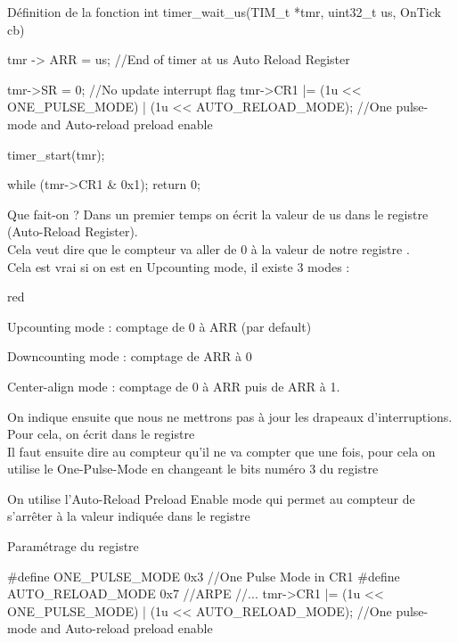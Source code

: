 \begin{Cpp}{Définition de la fonction} 
int timer_wait_us(TIM_t *tmr, uint32_t us, OnTick cb) 
{

tmr -> ARR = us;			//End of timer at us   Auto Reload Register
		
tmr->SR = 0; 														//No update interrupt flag
tmr->CR1 |=  (1u << ONE_PULSE_MODE) | (1u << AUTO_RELOAD_MODE);		//One pulse-mode and Auto-reload preload enable

timer_start(tmr);

while (tmr->CR1 & 0x1){};
return 0;
}
\end{Cpp}

Que fait-on ? Dans un premier temps on écrit la valeur de us dans le registre  (Auto-Reload Register).\\
Cela veut dire que le compteur va aller de 0 à la valeur de notre registre .\\
Cela est vrai si on est en Upcounting mode, il existe 3 modes : \\

\begin{items}{red}{\Triangle}
\item Upcounting mode : comptage de 0 à ARR (par default)
\item Downcounting mode : comptage de ARR à 0 
\item Center-align mode : comptage de 0 à ARR puis de ARR à 1.
\end{items}

On indique ensuite que nous ne mettrons pas à jour les drapeaux d'interruptions. Pour cela, on écrit  dans le registre \\
Il faut ensuite dire au compteur qu'il ne va compter que une fois, pour cela on utilise le One-Pulse-Mode en changeant le bits numéro 3 du registre  


On utilise l'Auto-Reload Preload Enable  mode qui permet au compteur de s'arrêter à la valeur indiquée dans le registre 


\begin{Cpp}{Paramétrage du registre } 

#define ONE_PULSE_MODE 0x3 //One Pulse Mode in CR1
#define AUTO_RELOAD_MODE 0x7 //ARPE
//...
tmr->CR1 |=  (1u << ONE_PULSE_MODE) | (1u << AUTO_RELOAD_MODE);		//One pulse-mode and Auto-reload preload enable
\end{Cpp}

